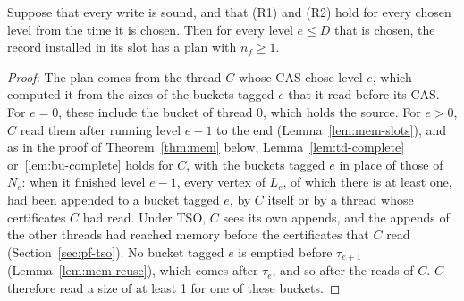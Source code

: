 \begin{lemma}
\label{lem:mem-end}
Suppose that every write is sound, and that (R1) and (R2) hold for every chosen level from the time it is chosen. Then for every level $e \leq D$ that is chosen, the record installed in its slot has a plan with $n_f \geq 1$.
\end{lemma}
\begin{proof}
The plan comes from the thread $C$ whose CAS chose level $e$, which computed it from the sizes of the buckets tagged $e$ that it read before its CAS. For $e = 0$, these include the bucket of thread $0$, which holds the source. For $e > 0$, $C$ read them after running level $e-1$ to the end (Lemma~\ref{lem:mem-slots}), and as in the proof of Theorem~\ref{thm:mem} below, Lemma~\ref{lem:td-complete} or~\ref{lem:bu-complete} holds for $C$, with the buckets tagged $e$ in place of those of $N_e$: when it finished level $e-1$, every vertex of $L_e$, of which there is at least one, had been appended to a bucket tagged $e$, by $C$ itself or by a thread whose certificates $C$ had read. Under TSO, $C$ sees its own appends, and the appends of the other threads had reached memory before the certificates that $C$ read (Section~\ref{sec:pf-tso}). No bucket tagged $e$ is emptied before $\tau_{e+1}$ (Lemma~\ref{lem:mem-reuse}), which comes after $\tau_e$, and so after the reads of $C$. $C$ therefore read a size of at least 1 for one of these buckets.
\end{proof}

